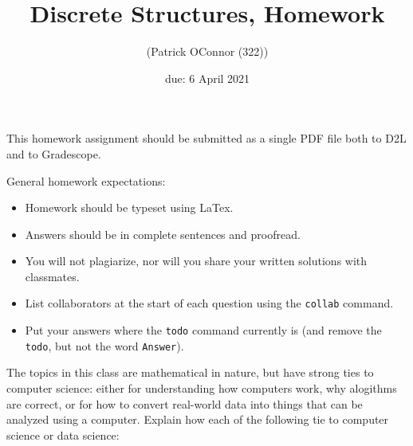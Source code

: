 \documentclass{article}
\title{Discrete Structures, Homework \hwnum}
\author{\todo{Patrick O'Connor} (Patrick OConnor (322))}
\date{due: 6 April 2021}
\begin{document}
\maketitle

This homework assignment should be
submitted as a single PDF file both to D2L and to Gradescope.

General homework expectations:
\begin{itemize}
    \item Homework should be typeset using LaTex.
    \item Answers should be in complete sentences and proofread.
    \item You will not plagiarize, nor will you share your written solutions
        with classmates.
    \item List collaborators at the start of each question using the \texttt{collab} command.
    \item Put your answers where the \texttt{todo} command currently is (and
        remove the \texttt{todo}, but not the word \texttt{Answer}).
\end{itemize}


\collab{\todo{}} 

The topics in this class are mathematical in nature, but have strong ties to
computer science: either for understanding how computers work, why alogithms are
correct, or for how to convert real-world data into things that can be analyzed
using a computer.  Explain how each of the following tie to computer science or
data science:
\end{document}
